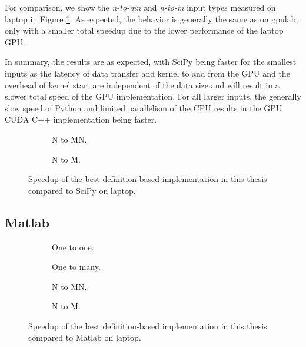 For comparison, we show the \textit{n-to-mn} and \textit{n-to-m} input types measured on laptop in Figure \ref{fig:scipy_speedup}. As expected, the behavior is generally the same as on gpulab, only with a smaller total speedup due to the lower performance of the laptop GPU.

In summary, the results are as expected, with SciPy being faster for the smallest inputs as the latency of data transfer and kernel to and from the GPU and the overhead of kernel start are independent of the data size and will result in a slower total speed of the GPU implementation. For all larger inputs, the generally slow speed of Python and limited parallelism of the CPU results in the GPU CUDA C++ implementation being faster.


\begin{figure}[ht]
	\centering	

	\begin{subfigure}{0.4\textwidth}
		\centering
		\def\svgwidth{\textwidth}
		
		\caption{N to MN.}
	\end{subfigure}
	\begin{subfigure}{0.4\textwidth}
		\centering
		\def\svgwidth{\textwidth}
		
		\caption{N to M.}
	\end{subfigure}
	\caption{Speedup of the best definition-based implementation in this thesis compared to SciPy on laptop.}
	\label{fig:scipy_speedup}
\end{figure}

\subsection{Matlab}

\begin{figure}[ht]
	\centering	
	\begin{subfigure}{0.4\textwidth}
		\centering
		\def\svgwidth{\textwidth}
		
		\caption{One to one.}
		\label{fig:matlab_one_to_one}
	\end{subfigure}
	\begin{subfigure}{0.4\textwidth}
		\centering
		\def\svgwidth{\textwidth}
		
		\caption{One to many.}
	\end{subfigure}
	\begin{subfigure}{0.4\textwidth}
		\centering
		\def\svgwidth{\textwidth}
		
		\caption{N to MN.}
	\end{subfigure}
	\begin{subfigure}{0.4\textwidth}
		\centering
		\def\svgwidth{\textwidth}
		
		\caption{N to M.}

	\end{subfigure}
	\caption{Speedup of the best definition-based implementation in this thesis compared to Matlab on laptop.}
	\label{fig:matlab_speedup}
\end{figure}

